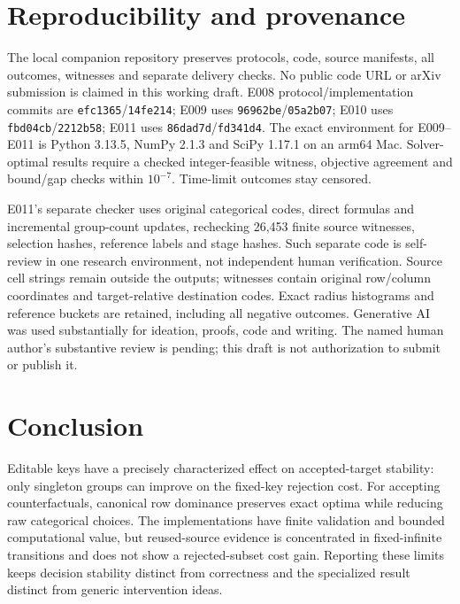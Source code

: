 \documentclass[11pt]{article}
\begin{document}
\section{Reproducibility and provenance}
The local companion repository preserves protocols, code, source manifests,
all outcomes, witnesses and separate delivery checks. No public code URL or
arXiv submission is claimed in this working draft. E008 protocol/implementation
commits are \texttt{efc1365}/\texttt{14fe214}; E009 uses
\texttt{96962be}/\texttt{05a2b07}; E010 uses
\texttt{fbd04cb}/\texttt{2212b58}; E011 uses
\texttt{86dad7d}/\texttt{fd341d4}. The exact environment for E009--E011 is
Python 3.13.5, NumPy 2.1.3 and SciPy 1.17.1 on an arm64 Mac.
Solver-optimal results require a checked integer-feasible witness, objective
agreement and bound/gap checks within $10^{-7}$. Time-limit outcomes stay censored.

E011's separate checker uses original categorical codes, direct formulas and
incremental group-count updates, rechecking 26,453 finite source witnesses,
selection hashes, reference labels and stage hashes. Such separate code is
self-review in one research environment, not independent human verification.
Source cell strings remain outside the outputs; witnesses contain original
row/column coordinates and target-relative destination codes. Exact radius
histograms and reference buckets are retained, including all negative outcomes.
Generative AI was used substantially for ideation, proofs, code and writing.
The named human author's substantive review is pending; this draft is not
authorization to submit or publish it.

\section{Conclusion}
Editable keys have a precisely characterized effect on accepted-target
stability: only singleton groups can improve on the fixed-key rejection cost.
For accepting counterfactuals, canonical row dominance preserves exact optima
while reducing raw categorical choices. The implementations have finite
validation and bounded computational value, but reused-source evidence is
concentrated in fixed-infinite transitions and does not show a rejected-subset
cost gain. Reporting these limits keeps decision stability distinct from
correctness and the specialized result distinct from generic intervention ideas.
\end{document}
